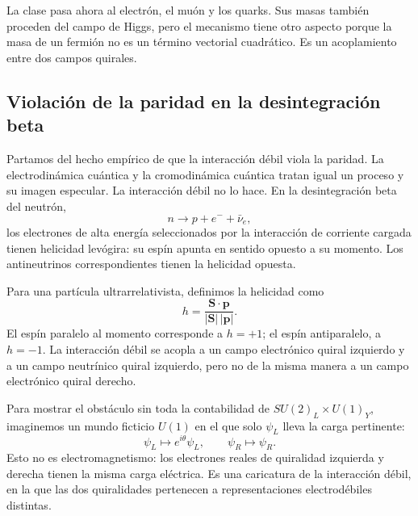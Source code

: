 La clase pasa ahora al electrón, el muón y los quarks. Sus masas también proceden del campo de Higgs, pero el mecanismo tiene otro aspecto porque la masa de un fermión no es un término vectorial cuadrático. Es un acoplamiento entre dos campos quirales.

\subsection{Violación de la paridad en la desintegración beta}

Partamos del hecho empírico de que la interacción débil viola la paridad. La electrodinámica cuántica y la cromodinámica cuántica tratan igual un proceso y su imagen especular. La interacción débil no lo hace. En la desintegración beta del neutrón,
\begin{equation}
  n\longrightarrow p+e^-+\bar\nu_e,
  \label{eq:l09-beta-decay}
\end{equation}
los electrones de alta energía seleccionados por la interacción de corriente cargada tienen helicidad levógira: su espín apunta en sentido opuesto a su momento. Los antineutrinos correspondientes tienen la helicidad opuesta.

Para una partícula ultrarrelativista, definimos la helicidad como
\begin{equation}
  h=\frac{\bm S\cdot\bm p}{|\bm S|\,|\bm p|}.
\end{equation}
El espín paralelo al momento corresponde a \(h=+1\); el espín antiparalelo, a \(h=-1\). La interacción débil se acopla a un campo electrónico quiral izquierdo y a un campo neutrínico quiral izquierdo, pero no de la misma manera a un campo electrónico quiral derecho.

Para mostrar el obstáculo sin toda la contabilidad de \(SU(2)_L\times U(1)_Y\), imaginemos un mundo ficticio \(U(1)\) en el que solo \(\psi_L\) lleva la carga pertinente:
\begin{equation}
  \psi_L\longmapsto e^{i\theta}\psi_L,
  \qquad
  \psi_R\longmapsto\psi_R .
  \label{eq:l09-chiral-toy-charge}
\end{equation}
Esto no es electromagnetismo: los electrones reales de quiralidad izquierda y derecha tienen la misma carga eléctrica. Es una caricatura de la interacción débil, en la que las dos quiralidades pertenecen a representaciones electrodébiles distintas.

